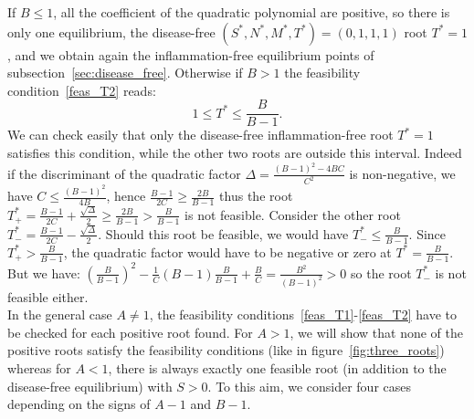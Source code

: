 \documentclass[a4paper, 12pt]{article}
\providecommand{\DIFaddtex}[1]{{\protect\color{blue} \sf #1}} %
\providecommand{\DIFdeltex}[1]{{\protect\color{red} \scriptsize #1}} %
\providecommand{\DIFaddbegin}{} %
\providecommand{\DIFaddend}{} %
\providecommand{\DIFdelbegin}{} %
\providecommand{\DIFdelend}{} %
\providecommand{\DIFadd}[1]{\texorpdfstring{\DIFaddtex{#1}}{#1}} %
\providecommand{\DIFdel}[1]{\texorpdfstring{\DIFdeltex{#1}}{}} %
\begin{document}
 If $B \leq 1$, all the coefficient of the quadratic polynomial are positive, so there is only one \DIFdelbegin \DIFdel{equilibrium, the disease-free $(S^*, N^*, M^*, T^*) = (0, 1, 1, 1)$}\DIFdelend \DIFaddbegin \DIFadd{root $T^* = 1$, and we obtain again the inflammation-free equilibrium points of subsection~\ref{sec:disease_free}}\DIFaddend . 
 Otherwise if $B>1$ the feasibility condition~\eqref{feas_T2} reads:
\begin{equation}
1 \leq T^* \leq \frac{B}{B-1}.
\end{equation}
 We can check easily that only the \DIFdelbegin \DIFdel{disease-free }\DIFdelend \DIFaddbegin \DIFadd{inflammation-free }\DIFaddend root $T^* = 1$ satisfies this condition, while the other two roots are outside this interval.
 Indeed if the discriminant of the quadratic factor $\Delta = \frac{{(B-1)}^2 - 4BC}{C^2}$ is non-negative, we have $C \leq \frac{{(B-1)}^2}{4B}$, 
 hence $\frac{B-1}{2C} \geq  \frac{2B}{B-1}$ thus the root $T_+^* = \frac{B-1}{2C} + \frac{\sqrt{\Delta}}{2} \geq \frac{2B}{B-1} > \frac{B}{B-1}  $ is not feasible.
 Consider the other root $T_-^* = \frac{B-1}{2C} - \frac{\sqrt{\Delta}}{2}$.
 Should this root be feasible, we would have $ T_-^* \leq \frac{B}{B-1}$. Since $T_+^* > \frac{B}{B-1}$, the quadratic factor would have to be negative or zero at $T^* = \frac{B}{B-1}$. But we have: ${\left(\frac{B}{B-1}\right)}^2 - \frac{1}{C} (B - 1) \frac{B}{B-1} + \frac{B}{C} = \frac{B^2}{{(B-1)}^2} > 0$ so the root $T_-^*$ is not feasible either.  
\bigskip\\
In the general case $A \neq 1$, the feasibility conditions~\eqref{feas_T1}-\eqref{feas_T2} have to be checked for each positive root found. 
For $A>1$, we will show that none of the positive roots satisfy the feasibility conditions (like in figure~\ref{fig:three_roots}) whereas for $A<1$, there is always exactly one feasible root \DIFdelbegin \DIFdel{(in addition to the disease-free equilibrium)}\DIFdelend \DIFaddbegin \DIFadd{with $S>0$}\DIFaddend . 
To this aim, we consider four cases  depending on the signs of $A - 1$ and $B - 1$.
\end{document}
